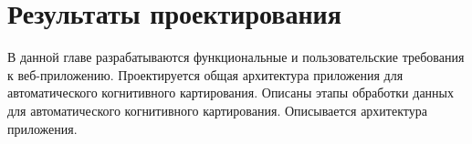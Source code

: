 \chapter{Результаты проектирования}

\begin{annotation}
	В данной главе разрабатываются функциональные и пользовательские требования к веб-приложению.
	Проектируется общая архитектура приложения для автоматического когнитивного картирования.
	Описаны этапы обработки данных для автоматического когнитивного картирования.
	Описывается архитектура приложения.
\end{annotation}










